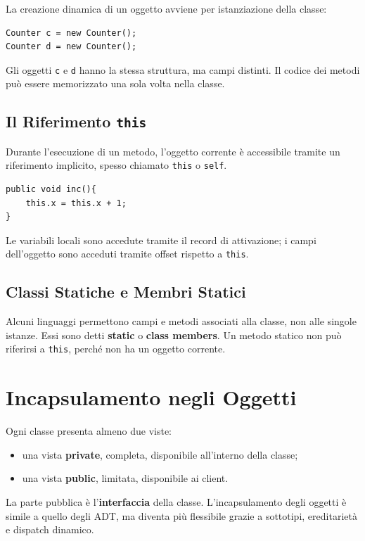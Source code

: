 \documentclass{article}
\begin{document}
La creazione dinamica di un oggetto avviene per istanziazione della classe:

\begin{lstlisting}
Counter c = new Counter();
Counter d = new Counter();
\end{lstlisting}

Gli oggetti \texttt{c} e \texttt{d} hanno la stessa struttura, ma campi distinti. Il codice dei metodi può essere memorizzato una sola volta nella classe.

\subsection{Il Riferimento \texttt{this}}

Durante l'esecuzione di un metodo, l'oggetto corrente è accessibile tramite un riferimento implicito, spesso chiamato \texttt{this} o \texttt{self}.

\begin{lstlisting}
public void inc(){
    this.x = this.x + 1;
}
\end{lstlisting}

Le variabili locali sono accedute tramite il record di attivazione; i campi dell'oggetto sono acceduti tramite offset rispetto a \texttt{this}.

\subsection{Classi Statiche e Membri Statici}

Alcuni linguaggi permettono campi e metodi associati alla classe, non alle singole istanze. Essi sono detti \textbf{static} o \textbf{class members}. Un metodo statico non può riferirsi a \texttt{this}, perché non ha un oggetto corrente.

\section{Incapsulamento negli Oggetti}

Ogni classe presenta almeno due viste:
\begin{itemize}
  \item una vista \textbf{private}, completa, disponibile all'interno della classe;
  \item una vista \textbf{public}, limitata, disponibile ai client.
\end{itemize}

La parte pubblica è l'\textbf{interfaccia} della classe. L'incapsulamento degli oggetti è simile a quello degli ADT, ma diventa più flessibile grazie a sottotipi, ereditarietà e dispatch dinamico.
\end{document}

